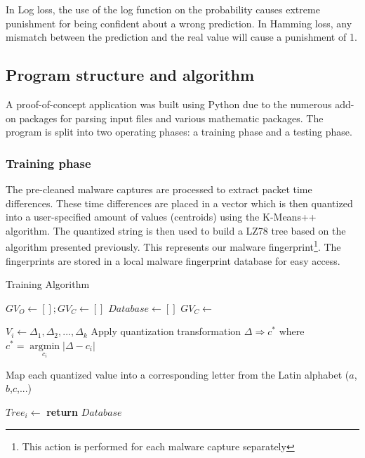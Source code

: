 \documentclass[13pt,journal,compsoc,onecolumn]{IEEEtran}
\makeatletter
\def\NoNumber#1{{\def\alglinenumber##1{}\State #1}\addtocounter{ALG@line}{-1}}
\makeatother
\begin{document}
In Log loss, the use of the log function on the probability causes extreme punishment for being confident about a wrong prediction.
In Hamming loss, any mismatch between the prediction and the real value will cause a punishment of 1.

\subsection{Program structure and algorithm}
A proof-of-concept application was built using Python due to the numerous add-on packages for parsing input files and various mathematic packages.
The program is split into two operating phases: a training phase and a testing phase.

\subsubsection{Training phase}\label{section:trainingp}
The pre-cleaned malware captures are processed to extract packet time differences.
These time differences are placed in a vector which is then quantized into a user-specified amount of values (centroids) using the K-Means++ algorithm. 
The quantized string is then used to build a LZ78 tree based on the algorithm presented previously. This represents our malware fingerprint\footnote{This action is performed for each malware capture separately}.
The fingerprints are stored in a local malware fingerprint database for easy access.
\begin{algorithm}
\caption{Training Algorithm}\label{alg:training}
\begin{algorithmic}[1]
\State ${GV}_O\gets[]; {GV}_C\gets[]$
\State ${Database}\gets[]$
   	\State {}
   \EndFor
   \State ${GV}_C\gets$

   	\State $V_i\gets\Delta_1,\Delta_2,...,\Delta_k$
   	\State Apply quantization transformation $
   	\Delta  \Rightarrow {c^*}$ 
   	\NoNumber{where ${c^*} = \mathop {\arg \min }\limits_{{c_i}} \left| {\Delta  - {c_i}} \right|$}
   	\State Map each quantized value  into a corresponding
   	\NoNumber{letter from the Latin alphabet ($a$,$b$,$c$,...)}
   	\State ${Tree}_i\gets$
    \State {} \label{alg:training:append_db}
   \EndFor
   \State \textbf{return} $Database$
\EndProcedure
\end{algorithmic}
\end{algorithm}
\end{document}
